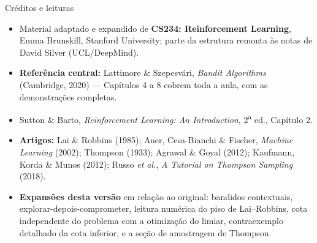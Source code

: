 \documentclass[aspectratio=169, 10pt]{beamer}
\begin{document}
\begin{frame}{Créditos e leituras}
  \begin{itemize}
    \item Material adaptado e expandido de \textbf{CS234: Reinforcement
          Learning}, Emma Brunskill, Stanford University; parte da
          estrutura remonta às notas de David Silver (UCL/DeepMind).
    \item \textbf{Referência central:} Lattimore \& Szepesvári,
          \emph{Bandit Algorithms} (Cambridge, 2020) --- Capítulos 4 a 8
          cobrem toda a aula, com as demonstrações completas.
    \item Sutton \& Barto, \emph{Reinforcement Learning: An Introduction},
          2\textsuperscript{a} ed., Capítulo 2.
    \item \textbf{Artigos:} Lai \& Robbins (1985); Auer, Cesa-Bianchi \&
          Fischer, \emph{Machine Learning} (2002); Thompson (1933);
          Agrawal \& Goyal (2012); Kaufmann, Korda \& Munos (2012);
          Russo \emph{et al.}, \emph{A Tutorial on Thompson Sampling} (2018).
    \item \textbf{Expansões desta versão} em relação ao original: bandidos
          contextuais, explorar-depois-comprometer, leitura numérica do
          piso de Lai--Robbins, cota independente do problema com a
          otimização do limiar, contraexemplo detalhado da cota inferior,
          e a seção de amostragem de Thompson.
  \end{itemize}
\end{frame}
\end{document}

